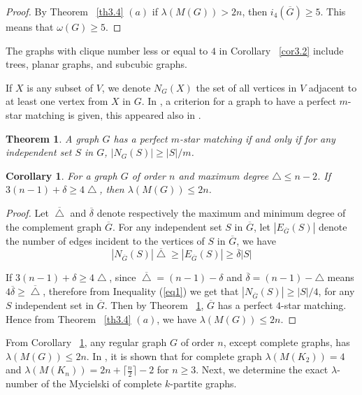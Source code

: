 \documentclass{article}
\newtheorem{theorem} {Theorem}
\newtheorem{cor} {Corollary}
\newtheorem{open problem} {Open Problem}
\numberwithin{lemma}{section}
\numberwithin{theorem}{section}
\numberwithin{cor}{section}
\numberwithin{prop}{section}
\numberwithin{con}{section}
\numberwithin{claim}{section}
\numberwithin{obs}{section}
\numberwithin{dnt}{section}
\begin{document}
\begin{proof}
	By Theorem ~\ref{th3.4} $(a)$ if $\lambda(M(G))> 2n$, then $i_4(\overline{G})\geq 5$. This means that $\omega(G)\geq 5$. 
\end{proof}
The graphs with clique number less or equal to $4$ in Corollary ~\ref{cor3.2} include trees, planar graphs, and subcubic graphs. \par
If $X$ is any subset of $V$, we denote $N_G(X)$ the set of all vertices in $V$ adjacent to at least one vertex from $X$ in $G$. In \cite{lin}, a criterion for a graph to have a perfect $m$-star matching is given, this appeared also in \cite{kano,kirk,las}.
\begin{theorem}\label{th3.5}\cite{kano,kirk,lin,las}
	A graph $G$ has a perfect $m$-star matching if and only if for any independent set $S$ in $G$, $|N_G(S)|\geq  |S|/m $. 
\end{theorem}
\begin{cor}\label{cor3.3}
	For a graph $G$ of order $n$ and maximum degree $\bigtriangleup \leq n-2 $. If $ 3(n-1)+ \delta \geq 4 \bigtriangleup $, then $ \lambda(M(G))\leq 2n$.
\end{cor}
\begin{proof}
	Let $\overline{\bigtriangleup}$ and $\overline{\delta}$ denote respectively the maximum and minimum degree of the complement graph $\overline{G}$.
	For any independent set $S$ in $\overline{G}$, let $|E_{\overline{G}}(S)|$ denote the number of edges incident to the vertices of $S$ in $\overline{G}$, we have
	\begin{equation}\label{eq1}
|N_{\overline{G}}(S)| \overline{\bigtriangleup} \geq |E_{\overline{G}}(S)| \geq  \overline{\delta} |S| 
	\end{equation}
	 \par If $3(n-1)+ \delta \geq 4 \bigtriangleup $, since $\overline{\bigtriangleup}=(n-1)-\delta$ and $\overline{\delta}=(n-1)-\bigtriangleup$ means  $ 4\overline{\delta}\geq \overline{\bigtriangleup} $, therefore from Inequality (\ref{eq1}) we get that $|N_{\overline{G}}(S)|\geq |S|/4 $, for any $S$  independent set in $\overline{G}$. Then by Theorem ~\ref{th3.5}, $\overline{G}$ has a perfect $4$-star matching. Hence from Theorem ~\ref{th3.4} $(a)$, we have  $ \lambda(M(G))\leq 2n $.
\end{proof}
From Corollary ~\ref{cor3.3}, any regular graph $G$ of order $n$, except complete graphs,  has  $\lambda(M(G))\leq 2n$. In \cite{lin}, it is shown that for complete graph $\lambda(M(K_2))=4$ and  $\lambda(M(K_n))=2n+\lceil \frac{n}{2} \rceil -2$ for $n\geq 3$. Next, we determine the exact $\lambda$-number of the Mycielski of complete $k$-partite graphs.
\end{document}
